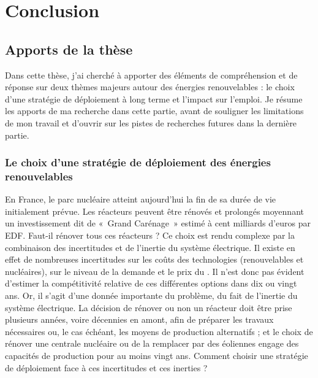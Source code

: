 \chapter{Conclusion} \label{chap:conclusion}

\section{Apports de la thèse} \label{sec:apports}

Dans cette thèse, j’ai cherché à apporter des éléments de compréhension et de réponse sur deux thèmes majeurs autour des énergies renouvelables : le choix d’une stratégie de déploiement à long terme et l'impact sur l’emploi. 
Je résume les apports de ma recherche dans cette partie, avant de souligner les limitations de mon travail et d'ouvrir sur les pistes de recherches futures dans la dernière partie.

\subsection{Le choix d'une stratégie de déploiement des énergies renouvelables}

En France, le parc nucléaire atteint aujourd'hui la fin de sa durée de vie initialement prévue. Les réacteurs peuvent être rénovés et prolongés moyennant un investissement dit de «~Grand Carénage~» estimé à cent milliards d'euros par EDF. Faut-il rénover tous ces réacteurs ? Ce choix est rendu complexe par la combinaison des incertitudes et de l'inertie du système électrique.
Il existe en effet de nombreuses incertitudes sur les coûts des technologies (renouvelables et nucléaires), sur le niveau de la demande et le prix du \coo. Il n'est donc pas évident d'estimer la compétitivité relative de ces différentes options dans dix ou vingt ans. Or, il s'agit d'une donnée importante du problème, du fait de l'inertie du système électrique.
La décision de rénover ou non un réacteur doit être prise plusieurs années, voire décennies en amont, afin de préparer les travaux nécessaires ou, le cas échéant, les moyens de production alternatifs ; et le choix de rénover une centrale nucléaire ou de la remplacer par des éoliennes engage des capacités de production pour au moins vingt ans.
Comment choisir une stratégie de déploiement face à ces incertitudes et ces inerties ?

